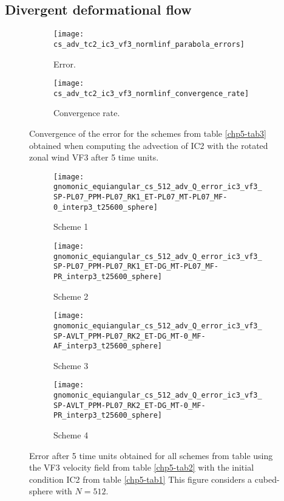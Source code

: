 \subsection{Divergent deformational flow}
\begin{figure}[!htb]
	\centering
	\begin{subfigure}{0.42\textwidth}
		\centering
		\texttt{[image: cs\_adv\_tc2\_ic3\_vf3\_normlinf\_parabola\_errors]}
		\caption{Error.\label{chp5-adv4-error}}
	\end{subfigure}
	\begin{subfigure}{0.42\textwidth}
		\centering
		\texttt{[image: cs\_adv\_tc2\_ic3\_vf3\_normlinf\_convergence\_rate]}
		\caption{Convergence rate.\label{chp5-adv4-cr}}
	\end{subfigure}
	\caption{Convergence of the error for the schemes from table \ref{chp5-tab3} obtained when computing the advection of IC2  with the rotated zonal wind VF3 after 5 time units.
		\label{chp5-error-adv4}}
\end{figure}


\begin{figure}[!htb]
	\centering
	\begin{subfigure}{0.35\textwidth}
		\centering
		\texttt{[image: gnomonic\_equiangular\_cs\_512\_adv\_Q\_error\_ic3\_vf3\_SP-PL07\_PPM-PL07\_RK1\_ET-PL07\_MT-PL07\_MF-0\_interp3\_t25600\_sphere]}
		\caption{Scheme 1 \label{chp5-adv4-s1}}
	\end{subfigure}
	\begin{subfigure}{0.35\textwidth}
		\centering
		\texttt{[image: gnomonic\_equiangular\_cs\_512\_adv\_Q\_error\_ic3\_vf3\_SP-PL07\_PPM-PL07\_RK1\_ET-DG\_MT-PL07\_MF-PR\_interp3\_t25600\_sphere]}
		\caption{Scheme 2 \label{chp5-adv4-s2}}
	\end{subfigure}
	
	\begin{subfigure}{0.35\textwidth}
		\centering
		\texttt{[image: gnomonic\_equiangular\_cs\_512\_adv\_Q\_error\_ic3\_vf3\_SP-AVLT\_PPM-PL07\_RK2\_ET-DG\_MT-0\_MF-AF\_interp3\_t25600\_sphere]}
		\caption{Scheme 3 \label{chp5-adv4-s3}}
	\end{subfigure}
	\begin{subfigure}{0.35\textwidth}
		\centering
		\texttt{[image: gnomonic\_equiangular\_cs\_512\_adv\_Q\_error\_ic3\_vf3\_SP-AVLT\_PPM-PL07\_RK2\_ET-DG\_MT-0\_MF-PR\_interp3\_t25600\_sphere]}
		\caption{Scheme 4 \label{chp5-adv4-s4}}
	\end{subfigure}
	\caption{ Error after 5 time units obtained for all schemes from table using the VF3 velocity field from table \ref{chp5-tab2} with the initial condition IC2 from  table \ref{chp5-tab1} 
		This figure considers a cubed-sphere with $N=512$. \label{chp5-adv4}}
\end{figure}



